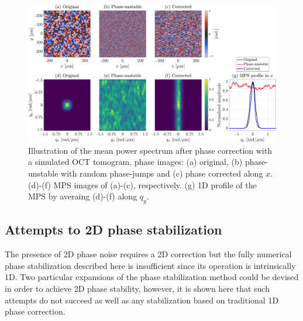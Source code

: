 \begin{figure}[htb!]
	\centering
	\includegraphics[width=\textwidth]{Figures/SHARP/PhaseStabilization/PhaseStabiliaztion1D-enface.pdf}
	\caption[Illustration of the mean power spectrum after phase correction with a simulated OCT tomogram.]{Illustration of the mean power spectrum after phase correction with a simulated OCT tomogram.  phase images: (a) original, (b) phase-unstable with random phase-jumps and (c) phase corrected along $x$. (d)-(f) MPS images of (a)-(c), respectively. (g) 1D profile of the MPS by averaing (d)-(f) along $q_y$.}
	\label{fig:PhaseStable1D-enface}
\end{figure}

\subsection{Attempts to 2D phase stabilization}

The presence of 2D phase noise requires a 2D correction but the fully numerical phase stabilization described here is insufficient since its operation is intrinsically 1D. Two particular expansions of the phase stabilization method could be devised in order to achieve 2D phase stability, however, it is shown here that such attempts do not succeed as well as any stabilization based on traditional 1D phase correction.

